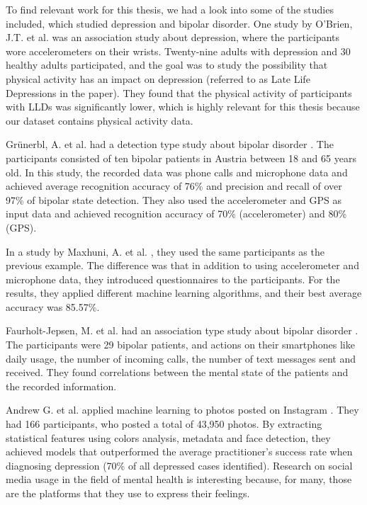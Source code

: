 To find relevant work for this thesis, we had a look into some of the studies included, which studied depression and bipolar disorder. One study by O'Brien, J.T. et al. \cite{obrien_depression} was an association study about depression, where the participants wore accelerometers on their wrists. Twenty-nine adults with depression and 30 healthy adults participated, and the goal was to study the possibility that physical activity has an impact on depression (referred to as Late Life Depressions in the paper). They found that the physical activity of participants with LLDs was significantly lower, which is highly relevant for this thesis because our dataset contains physical activity data. 

Grünerbl, A. et al. had a detection type study about bipolar disorder \cite{grunerbl_smartphone_bipolar}. The participants consisted of ten bipolar patients in Austria between 18 and 65 years old. In this study, the recorded data was phone calls and microphone data and achieved average recognition accuracy of 76\% and precision and recall of over 97\% of bipolar state detection. They also used the accelerometer and GPS as input data and achieved recognition accuracy of 70\% (accelerometer) and 80\% (GPS).

In a study by Maxhuni, A. et al. \cite{maxhuni2016}, they used the same participants as the previous example. The difference was that in addition to using accelerometer and microphone data, they introduced questionnaires to the participants. For the results, they applied different machine learning algorithms, and their best average accuracy was 85.57\%.

Faurholt-Jepsen, M. et al. had an association type study about bipolar disorder \cite{faurholt_smartphone_bipolar}. The participants were 29 bipolar patients, and actions on their smartphones like daily usage, the number of incoming calls, the number of text messages sent and received. They found correlations between the mental state of the patients and the recorded information. 

Andrew G. et al. applied machine learning to photos posted on Instagram \cite{instagram_depression}. They had 166 participants, who posted a total of 43,950 photos. By extracting statistical features using colors analysis, metadata and face detection, they achieved models that outperformed the average practitioner's success rate when diagnosing depression (70\% of all depressed cases identified). Research on social media usage in the field of mental health is interesting because, for many, those are the platforms that they use to express their feelings. 

